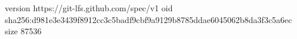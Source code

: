 version https://git-lfs.github.com/spec/v1
oid sha256:d981e3e3439f8912cc3c5badf9cbf9a9129b8785ddae6045062b8da3f3c5a6ec
size 87536
